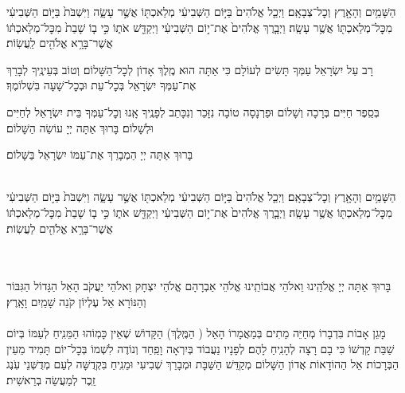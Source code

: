 \documentclass[twoside, openany, parskip=half, 11pt]{book}
\begin{document}
הַשָּׁמַ֥יִם וְהָאָ֖רֶץ וְכׇל־צְבָאָֽם׃ וַיְכַ֤ל אֱלֹהִים֙ בַּיּ֣וֹם הַשְּׁבִיעִ֔י מְלַאכְתּ֖וֹ אֲשֶׁ֣ר עָשָׂ֑ה וַיִּשְׁבֹּת֙ בַּיּ֣וֹם הַשְּׁבִיעִ֔י מִכׇּל־מְלַאכְתּ֖וֹ אֲשֶׁ֥ר עָשָֽׂה׃ וַיְבָ֤רֶךְ אֱלֹהִים֙ אֶת־י֣וֹם הַשְּׁבִיעִ֔י וַיְקַדֵּ֖שׁ אֹת֑וֹ כִּ֣י ב֤וֹ שָׁבַת֙ מִכׇּל־מְלַאכְתּ֔וֹ אֲשֶׁר־בָּרָ֥א אֱלֹהִ֖ים לַֽעֲשֽׂוֹת׃

\shabboskiddushhayom{}

\sepline

\label{maarivyt}
\ytkiddushhayom{\YTShabboshavdalah}


\sepline

\retzeh

\yaalehveyavo

\zion

\maarivmodim

\shabboschanukah

\shabboshodos

רָב עַל יִשְׂרָאֵל עַמְּךָ תָּשִׂים לְעוֹלָם כִּי אַתָּה הוּא מֶֽלֶךְ אָדוֹן לְכׇל־הַשָּׁלוֹם׃ וְטוֹב בְּעֵינֶֽיךָ לְבָרֵךְ אֶת־עַמְּךָ יִשְׂרָאֵל בְּכׇל־עֵת וּבְכׇל־שָׁעָה בִּשְׁלוֹמֶךָ׃
\vspace{-0.4\baselineskip}
\begin{paracol}{2}

\begin{small}
בְּסֵֽפֶר חַיִּים בְּרָכָה וְשָׁלוֹם וּפַרְנָסָה טוֹבָה נִזָּכֵר וְנִכָּתֵב לְפָנֶֽיךָ אָֽנוּ וְכׇל־עַמְּךָ בֵּית יִשְׂרָאֵל לְחַיִּים וּלְשָׁלוֹם׃ בָּרוּךְ אַתָּה יְיָ עוֹשֵׂה הַשָּׁלוֹם׃
\end{small}


\switchcolumn

בָּרוּךְ אַתָּה יְיָ הַמְבָרֵךְ אֶת־עַמּוֹ יִשְׂרָאֵל בַּשָּׁלוֹם׃

\end{paracol}

\tachanunim


\label{vayachulu}
\\
 
הַשָּׁמַ֥יִם וְהָאָ֖רֶץ וְכׇל־צְבָאָֽם׃ וַיְכַ֤ל אֱלֹהִים֙ בַּיּ֣וֹם הַשְּׁבִיעִ֔י מְלַאכְתּ֖וֹ אֲשֶׁ֣ר עָשָׂ֑ה וַיִּשְׁבֹּת֙ בַּיּ֣וֹם הַשְּׁבִיעִ֔י מִכׇּל־מְלַאכְתּ֖וֹ אֲשֶׁ֥ר עָשָֽׂה׃ וַיְבָ֤רֶךְ אֱלֹהִים֙ אֶת־י֣וֹם הַשְּׁבִיעִ֔י וַיְקַדֵּ֖שׁ אֹת֑וֹ כִּ֣י ב֤וֹ שָׁבַת֙ מִכׇּל־מְלַאכְתּ֔וֹ אֲשֶׁר־בָּרָ֥א אֱלֹהִ֖ים לַעֲשֽׂוֹת׃


\\
\\
בָּרוּךְ אַתָּה יְיָ אֱלֹהֵֽינוּ וֵאלֹהֵי אֲבוֹתֵֽינוּ אֱלֹהֵי אַבְרָהָם אֱלֹהֵי יִצְחָק וֵאלֹהֵי יַעֲקֹב הָאֵל הַגָּדוֹל הַגִּבּוֹר וְהַנּוֹרָא אֵל עֶלְיוֹן קֹנֵה שָׁמַֽיִם וָאָֽרֶץ׃\\
\\
מָגֵן אָבוֹת בִּדְבָרוֹ מְחַיֵּה מֵתִים בְּמַאֲמָרוֹ הָאֵל
( הַמֶּֽלֶךְ)
הַקָּדוֹשׁ שֶׁאֵין כָּמֽוֹהוּ הַמֵּנִֽיחַ לְעַמּוֹ בְּיוֹם שַׁבַּת קָדְשׁוֹ כִּי בָם רָצָה לְהָנִֽיחַ לָהֶם׃ לְפָנָיו נַעֲבוֹד בְּיִרְאָה וָפַֽחַד וְנוֹדֶה לִשְׁמוֹ בְּכׇל־יוֹם תָּמִיד מֵעֵין הַבְּרָכוֹת׃ אֵל הַהוֹדָאוֹת אֲדוֹן הַשָּׁלוֹם מְקַדֵּשׁ הַשַּׁבָּת וּמְבָרֵךְ שְׁבִיעִי וּמֵנִֽיחַ בִּקְדֻשָּׁה לְעַם מְדֻשְּׁנֵי עֹֽנֶג זֵֽכֶר לְמַעֲשֵׂה בְרֵאשִׁית׃
\end{document}
